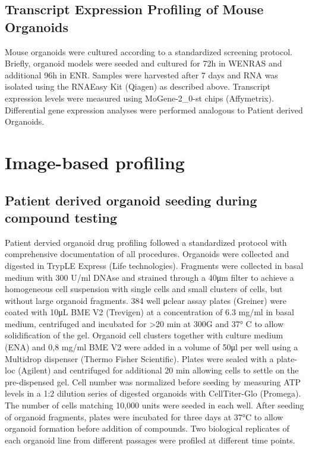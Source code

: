 \begin{flushleft}
\subsection{Transcript Expression Profiling of Mouse Organoids}
Mouse organoids were cultured according to a standardized screening protocol. Briefly, organoid models were seeded and cultured for 72h in WENRAS and additional 96h in ENR. Samples were harvested after 7 days and RNA was isolated using the RNAEasy Kit (Qiagen) as described above. Transcript expression levels were measured using MoGene-2\_0-st chips (Affymetrix).
Differential gene expression analyses were performed analogous to Patient derived Organoids.

\section{Image-based profiling}

\subsection{Patient derived organoid seeding during compound testing}
Patient dervied organoid drug profiling followed a standardized protocol with comprehensive documentation of all procedures. Organoids were collected and digested in TrypLE Express (Life technologies). Fragments were collected in basal medium with 300 U/ml DNAse and strained through a 40μm filter to achieve a homogeneous cell suspension with single cells and small clusters of cells, but without large organoid fragments. 384 well μclear assay plates (Greiner) were coated with 10μL BME V2 (Trevigen) at a concentration of 6.3 mg/ml in basal medium, centrifuged and incubated for >20 min at 300G and 37° C to allow solidification of the gel. Organoid cell clusters together with culture medium (ENA) and 0,8 mg/ml BME V2 were added in a volume of 50μl per well using a Multidrop dispenser (Thermo Fisher Scientific). Plates were sealed with a plate-loc (Agilent) and centrifuged for additional 20 min allowing cells to settle on the pre-dispensed gel. Cell number was normalized before seeding by measuring ATP levels in a 1:2 dilution series of digested organoids with CellTiter-Glo (Promega). The number of cells matching 10,000 units were seeded in each well. After seeding of organoid fragments, plates were incubated for three days at 37°C to allow organoid formation before addition of compounds. Two biological replicates of each organoid line from different passages were profiled at different time points.


\end{flushleft}
